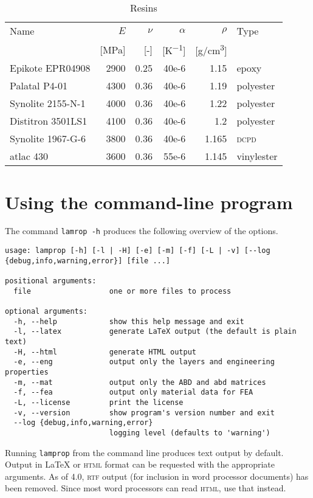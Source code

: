 \documentclass[a4paper,landscape,oneside,11pt,twocolumn]{memoir}
\begin{document}
\begin{table}[!htbp]
  \centering
  \caption{\label{tb:resins}Resins}
  \begin{tabular}{lrrrrl}%
      Name & $E$ & $\nu$ & $\alpha$ & $\rho$ & Type\\
      & [\si{MPa}] & [-] & [\si{K^{-1}}] & [\si{g/cm^3}]\\
    \midrule
      Epikote EPR04908 & 2900 & 0.25 & 40e-6 & 1.15 & epoxy\\
      Palatal P4-01 & 4300 & 0.36 & 40e-6 & 1.19 & polyester\\
      Synolite 2155-N-1 & 4000 & 0.36 & 40e-6 & 1.22 & polyester\\
      Distitron 3501LS1 & 4100 & 0.36 & 40e-6 & 1.2 & polyester\\
      Synolite 1967-G-6 & 3800 & 0.36 & 40e-6 & 1.165 & \textsc{dcpd}\\
      atlac 430 & 3600 & 0.36 & 55e-6 & 1.145 & vinylester\\
  \end{tabular}
\end{table}

\section{Using the command-line program} %

The command \texttt{lamrop -h} produces the following overview of the options.

\begin{lstlisting}[style=plain]
usage: lamprop [-h] [-l | -H] [-e] [-m] [-f] [-L | -v] [--log {debug,info,warning,error}] [file ...]

positional arguments:
  file                  one or more files to process

optional arguments:
  -h, --help            show this help message and exit
  -l, --latex           generate LaTeX output (the default is plain text)
  -H, --html            generate HTML output
  -e, --eng             output only the layers and engineering properties
  -m, --mat             output only the ABD and abd matrices
  -f, --fea             output only material data for FEA
  -L, --license         print the license
  -v, --version         show program's version number and exit
  --log {debug,info,warning,error}
                        logging level (defaults to 'warning')
\end{lstlisting}

Running \texttt{lamprop} from the command line produces text output by
default. Output in \LaTeX{} or \textsc{html} format can be requested with the
appropriate arguments. As of 4.0, \textsc{rtf} output (for inclusion in word
processor documents) has been removed. Since most word processors can read
\textsc{html}, use that instead.
\end{document}
